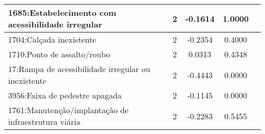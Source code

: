 \begin{table}[htbp]
\begin{tabular}{|l|c|c|c|c|}
		\hline
		1685:Estabelecimento com acessibilidade irregular    & 2                & -0.1614        & 1.0000           \\
		\hline
		1704:Calçada inexistente                             & 2                & -0.2354        & 0.4000           \\
		\hline
		1710:Ponto de assalto/roubo                          & 2                & 0.0313         & 0.4348           \\
		\hline
		17:Rampa de acessibilidade irregular ou inexistente  & 2                & -0.4443        & 0.0000           \\
		\hline
		3956:Faixa de pedestre apagada                       & 2                & -0.1145        & 0.0000           \\
		\hline
		1761:Manutenção/implantação de infraestrutura viária & 2                & -0.2283        & 0.5455           \\
		\hline
	\end{tabular}
\end{table}

